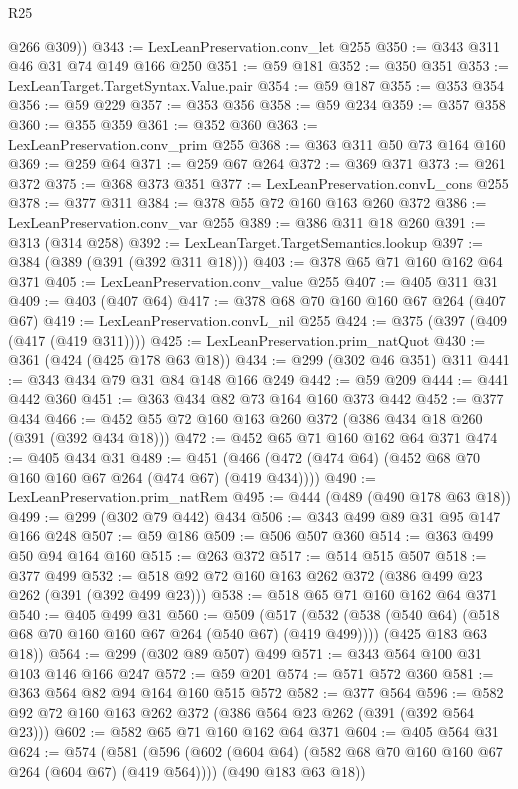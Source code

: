\begin{lexlean}{R25}
\begin{coremodule}
        @266
        @309))
@343 := LexLeanPreservation.conv_let @255
@350 := @343 @311 @46 @31 @74 @149 @166 @250
@351 := @59 @181
@352 := @350 @351
@353 := LexLeanTarget.TargetSyntax.Value.pair
@354 := @59 @187
@355 := @353 @354
@356 := @59 @229
@357 := @353 @356
@358 := @59 @234
@359 := @357 @358
@360 := @355 @359
@361 := @352 @360
@363 := LexLeanPreservation.conv_prim @255
@368 := @363 @311 @50 @73 @164 @160
@369 := @259 @64
@371 := @259 @67 @264
@372 := @369 @371
@373 := @261 @372
@375 := @368 @373 @351
@377 := LexLeanPreservation.convL_cons @255
@378 := @377 @311
@384 := @378 @55 @72 @160 @163 @260 @372
@386 := LexLeanPreservation.conv_var @255
@389 := @386 @311 @18 @260
@391 := @313 (@314 @258)
@392 := LexLeanTarget.TargetSemantics.lookup
@397 := @384 (@389 (@391 (@392 @311 @18)))
@403 := @378 @65 @71 @160 @162 @64 @371
@405 := LexLeanPreservation.conv_value @255
@407 := @405 @311 @31
@409 := @403 (@407 @64)
@417 := @378 @68 @70 @160 @160 @67 @264 (@407 @67)
@419 := LexLeanPreservation.convL_nil @255
@424 := @375 (@397 (@409 (@417 (@419 @311))))
@425 := LexLeanPreservation.prim_natQuot
@430 := @361 (@424 (@425 @178 @63 @18))
@434 := @299 (@302 @46 @351) @311
@441 := @343 @434 @79 @31 @84 @148 @166 @249
@442 := @59 @209
@444 := @441 @442 @360
@451 := @363 @434 @82 @73 @164 @160 @373 @442
@452 := @377 @434
@466 := @452 @55 @72 @160 @163 @260 @372 (@386 @434 @18 @260 (@391 (@392 @434 @18)))
@472 := @452 @65 @71 @160 @162 @64 @371
@474 := @405 @434 @31
@489 := @451 (@466 (@472 (@474 @64) (@452 @68 @70 @160 @160 @67 @264 (@474 @67) (@419 @434))))
@490 := LexLeanPreservation.prim_natRem
@495 := @444 (@489 (@490 @178 @63 @18))
@499 := @299 (@302 @79 @442) @434
@506 := @343 @499 @89 @31 @95 @147 @166 @248
@507 := @59 @186
@509 := @506 @507 @360
@514 := @363 @499 @50 @94 @164 @160
@515 := @263 @372
@517 := @514 @515 @507
@518 := @377 @499
@532 := @518 @92 @72 @160 @163 @262 @372 (@386 @499 @23 @262 (@391 (@392 @499 @23)))
@538 := @518 @65 @71 @160 @162 @64 @371
@540 := @405 @499 @31
@560 := @509
    (@517
      (@532 (@538 (@540 @64) (@518 @68 @70 @160 @160 @67 @264 (@540 @67) (@419 @499))))
      (@425 @183 @63 @18))
@564 := @299 (@302 @89 @507) @499
@571 := @343 @564 @100 @31 @103 @146 @166 @247
@572 := @59 @201
@574 := @571 @572 @360
@581 := @363 @564 @82 @94 @164 @160 @515 @572
@582 := @377 @564
@596 := @582 @92 @72 @160 @163 @262 @372 (@386 @564 @23 @262 (@391 (@392 @564 @23)))
@602 := @582 @65 @71 @160 @162 @64 @371
@604 := @405 @564 @31
@624 := @574
    (@581
      (@596 (@602 (@604 @64) (@582 @68 @70 @160 @160 @67 @264 (@604 @67) (@419 @564))))
      (@490 @183 @63 @18))

\end{coremodule}
\end{lexlean}
